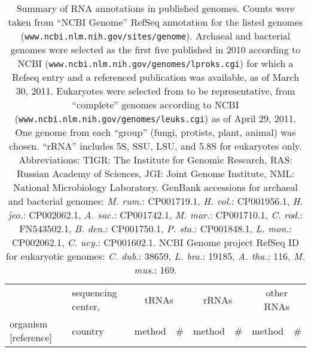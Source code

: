 \begin{table}
\caption{Summary of RNA annotations in published genomes.  Counts were
  taken from ``NCBI Genome'' RefSeq annotation for the listed genomes
  (\texttt{www.ncbi.nlm.nih.gov/sites/genome}). Archaeal and
  bacterial genomes were selected as the first five published in 2010
  according to NCBI
  (\texttt{www.ncbi.nlm.nih.gov/genomes/lproks.cgi}) for which
  a Refseq entry and a referenced publication was available, as of
  March 30, 2011. Eukaryotes were selected from to be representative,
  from ``complete'' genomes according to NCBI
  (\texttt{www.ncbi.nlm.nih.gov/genomes/leuks.cgi}) as of April
  29, 2011.  One genome from each ``group'' (fungi, protists, plant,
  animal) was chosen.  ``rRNA'' includes 5S, SSU, LSU, and 5.8S for
  eukaryotes only. Abbreviations: TIGR: The Institute for Genomic
  Research, RAS: Russian Academy of Sciences, JGI: Joint Genome
  Institute, NML: National Microbiology Laboratory.
  GenBank accessions for archaeal and bacterial genomes:
  \emph{M. rum.}:    CP001719.1,
  \emph{H. vol.}:       CP001956.1,
  \emph{H. jeo.}:       CP002062.1,
  \emph{A. sac.}: CP001742.1,
  \emph{M. mar.}:   CP001710.1,
  \emph{C. rod.}:      FN543502.1,
  \emph{B. den.}:        CP001750.1,
  \emph{P. sta.}:        CP001848.1,
  \emph{L. mon.}:  CP002062.1,
  \emph{C. ucy.}:         CP001602.1.
  NCBI Genome project RefSeq ID for eukaryotic genomes:
  \emph{C. dub.}:   38659,
  \emph{L. bra.}:   19185,
  \emph{A. tha.}:       116,
  \emph{M. mus.}:       169.}
\label{tbl:genomes}       
\begin{tabular}{|ll|lr|lr|lr|}
\hline\noalign{\smallskip}
                                         & sequencing center,&\multicolumn{2}{c|}{tRNAs}&\multicolumn{2}{c|}{rRNAs}& \multicolumn{2}{c|}{other RNAs} \\ \cline{3-8}
organism [reference]                     & country           & method        & \#       & method         & \# & method & \# \\

\end{tabular}
\end{table}
